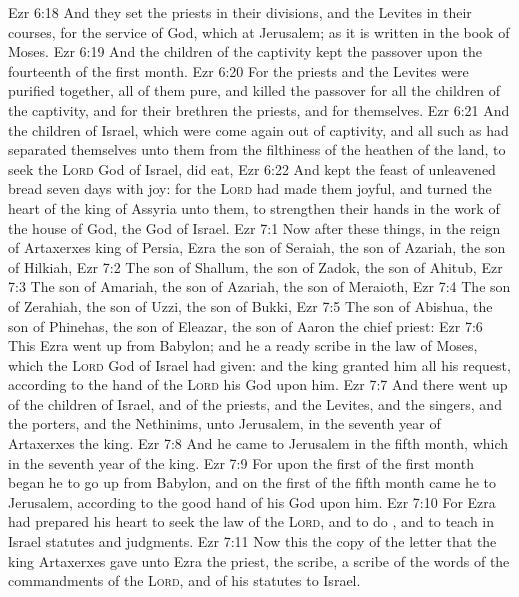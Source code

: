 \vs Ezr 6:18 And they set the priests in their divisions, and the Levites in their courses, for the service of God, which  at Jerusalem; as it is written in the book of Moses.
\vs Ezr 6:19 And the children of the captivity kept the passover upon the fourteenth  of the first month.
\vs Ezr 6:20 For the priests and the Levites were purified together, all of them  pure, and killed the passover for all the children of the captivity, and for their brethren the priests, and for themselves.
\vs Ezr 6:21 And the children of Israel, which were come again out of captivity, and all such as had separated themselves unto them from the filthiness of the heathen of the land, to seek the \textsc{Lord} God of Israel, did eat,
\vs Ezr 6:22 And kept the feast of unleavened bread seven days with joy: for the \textsc{Lord} had made them joyful, and turned the heart of the king of Assyria unto them, to strengthen their hands in the work of the house of God, the God of Israel.
\vs Ezr 7:1 Now after these things, in the reign of Artaxerxes king of Persia, Ezra the son of Seraiah, the son of Azariah, the son of Hilkiah,
\vs Ezr 7:2 The son of Shallum, the son of Zadok, the son of Ahitub,
\vs Ezr 7:3 The son of Amariah, the son of Azariah, the son of Meraioth,
\vs Ezr 7:4 The son of Zerahiah, the son of Uzzi, the son of Bukki,
\vs Ezr 7:5 The son of Abishua, the son of Phinehas, the son of Eleazar, the son of Aaron the chief priest:
\vs Ezr 7:6 This Ezra went up from Babylon; and he  a ready scribe in the law of Moses, which the \textsc{Lord} God of Israel had given: and the king granted him all his request, according to the hand of the \textsc{Lord} his God upon him.
\vs Ezr 7:7 And there went up  of the children of Israel, and of the priests, and the Levites, and the singers, and the porters, and the Nethinims, unto Jerusalem, in the seventh year of Artaxerxes the king.
\vs Ezr 7:8 And he came to Jerusalem in the fifth month, which  in the seventh year of the king.
\vs Ezr 7:9 For upon the first  of the first month began he to go up from Babylon, and on the first  of the fifth month came he to Jerusalem, according to the good hand of his God upon him.
\vs Ezr 7:10 For Ezra had prepared his heart to seek the law of the \textsc{Lord}, and to do , and to teach in Israel statutes and judgments.
\vs Ezr 7:11 Now this  the copy of the letter that the king Artaxerxes gave unto Ezra the priest, the scribe,  a scribe of the words of the commandments of the \textsc{Lord}, and of his statutes to Israel.

